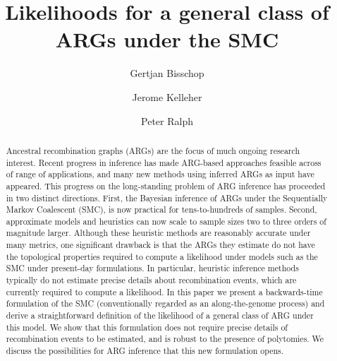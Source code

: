 \documentclass{article}
\begin{document}
\linenumbers
\title{Likelihoods for a general class of ARGs under the SMC}

\author[1, $\dagger$]{Gertjan Bisschop}
\author[1]{Jerome Kelleher}
\author[3]{Peter Ralph}


\maketitle


\begin{abstract}
Ancestral recombination graphs (ARGs) are the focus of much ongoing research
interest. Recent progress in inference has made ARG-based approaches feasible
across of range of applications, and many new methods using inferred ARGs as
input have appeared. This progress on the long-standing problem of ARG
inference has proceeded in two distinct directions. First,
the Bayesian inference of ARGs under the Sequentially Markov
Coalescent (SMC), is now practical for tens-to-hundreds of samples.
Second, approximate models and heuristics can now scale to sample sizes two to three
orders of magnitude larger. Although these heuristic methods are reasonably
accurate under many metrics, one significant drawback is that the ARGs they
estimate do not have the topological properties required to compute a
likelihood under models such as the SMC under present-day formulations.
In particular, heuristic inference methods typically do not estimate
precise details about recombination events, which are currently
required to compute a likelihood.
In this paper we present a
backwards-time formulation of the SMC (conventionally regarded as
an along-the-genome process)
and derive a straightforward definition
of the likelihood of a general class of ARG under this model.
We show that this formulation does not require precise details of recombination events
to be estimated, and is robust to the presence of polytomies.
We discuss the possibilities
for ARG inference that this new formulation opens. 
\end{abstract}


\end{document}
